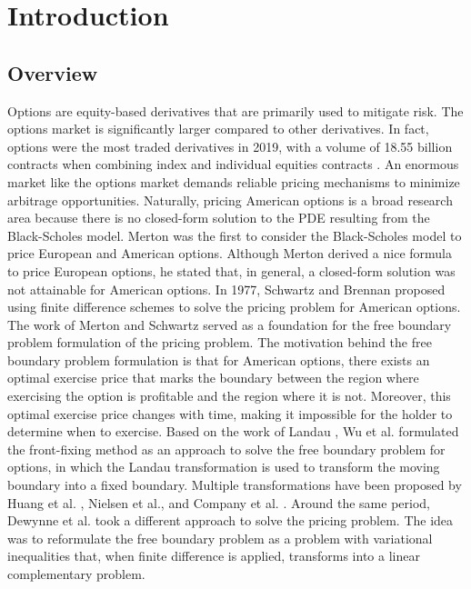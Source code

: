 \section{Introduction}

\subsection{Overview}

Options are equity-based derivatives that are primarily used to mitigate risk. The options market is significantly larger compared to other derivatives. In fact, options were the most traded derivatives in 2019, with a volume of 18.55 billion contracts when combining index and individual equities contracts \cite{statista_2019}. An enormous market like the options market demands reliable pricing mechanisms to minimize arbitrage opportunities. Naturally, pricing American options is a broad research area because there is no closed-form solution to the PDE resulting from the Black-Scholes model. Merton\cite{merton_1973} was the first to consider the Black-Scholes\cite{black_scholes_1973} model to price European and American options. Although Merton derived a nice formula to price European options, he stated that, in general, a closed-form solution was not attainable for American options. In 1977, Schwartz \cite{schwartz_197779} and Brennan \cite{brennan_1997} proposed using finite difference schemes to solve the pricing problem for American options. The work of Merton and Schwartz served as a foundation for the free boundary problem formulation of the pricing problem. The motivation behind the free boundary problem formulation is that for American options, there exists an optimal exercise price that marks the boundary between the region where exercising the option is profitable and the region where it is not. Moreover, this optimal exercise price changes with time, making it impossible for the holder to determine when to exercise. Based on the work of Landau \cite{landau_1950_heat_ci}, Wu et al. \cite{wu1997front} formulated the front-fixing method as an approach to solve the free boundary problem for options, in which the Landau transformation is used to transform the moving boundary into a fixed boundary. Multiple transformations have been proposed by Huang et al. \cite{huang_2000}, Nielsen et al.\cite{nielsen_2001}, and Company et al. \cite{company_egorova_jodar_2014}. Around the same period, Dewynne et al. \cite{dewynne_howison_rupf_wilmott_1993} took a different approach to solve the pricing problem. The idea was to reformulate the free boundary problem as a problem with variational inequalities that, when finite difference is applied, transforms into a linear complementary problem\cite{cottle_1968}.

